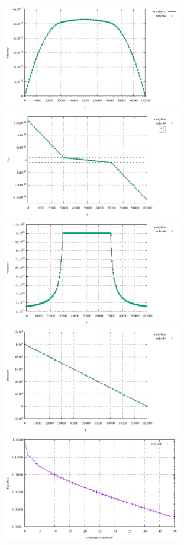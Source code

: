\begin{center}
\includegraphics[width=7.8cm]{python_codes/fieldstone_61/results/n_1/velocity.pdf}
\includegraphics[width=7.8cm]{python_codes/fieldstone_61/results/n_1/exy.pdf}\\
\includegraphics[width=7.8cm]{python_codes/fieldstone_61/results/n_1/eta.pdf}
\includegraphics[width=7.8cm]{python_codes/fieldstone_61/results/n_1/press.pdf}\\
\includegraphics[width=7.8cm]{python_codes/fieldstone_61/results/n_1/nonlinear_conv.pdf}
\end{center}

